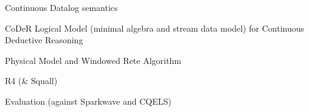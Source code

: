 Continuous Datalog semantics

CoDeR Logical Model (minimal algebra and stream data model) for Continuous Deductive Reasoning

Physical Model and Windowed Rete Algorithm

R4 (\& Squall)

Evaluation (against Sparkwave \cite{sparkwave} and CQELS)